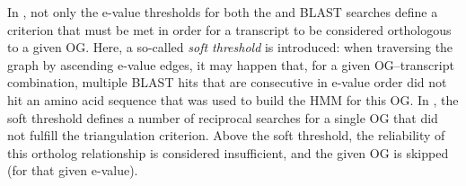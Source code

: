 In \pname, not only the e-value thresholds for both the  and
BLAST searches define a criterion that must be met in order for a transcript to
be considered orthologous to a given OG. Here, a so-called \emph{soft threshold}
is introduced: when traversing the graph by ascending  e-value
edges, it may happen that, for a given OG--transcript combination, multiple
BLAST hits that are consecutive in e-value order did not hit an amino acid
sequence that was used to build the HMM for this OG. In \pname, the soft
threshold defines a number of reciprocal searches for a single OG that did not
fulfill the triangulation criterion. Above the soft threshold, the reliability
of this ortholog relationship is considered insufficient, and the given OG is
skipped (for that given  e-value). 


